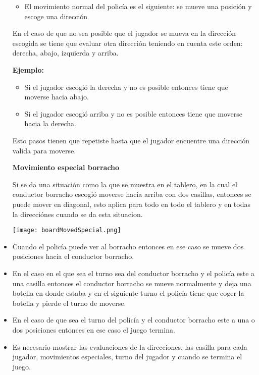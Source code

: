 \documentclass[10pt,a4paper]{article}
\begin{document}
\begin{itemize}
\begin{itemize}
		\item El movimiento normal del policía es el siguiente: se mueve una posición y escoge una dirección
	\end{itemize}
	En el caso de que no sea posible que el jugador se mueva en la dirección escogida se tiene que evaluar otra dirección teniendo en cuenta este orden: derecha, abajo, izquierda y arriba.
	\begin{flushleft}
		\textbf{Ejemplo:}
	\end{flushleft}
	\begin{itemize}
		\item Si el jugador escogió la derecha y no es posible entonces tiene que moverse hacia abajo.
		\item Si el jugador escogió arriba y no es posible entonces tiene que moverse hacia la derecha.
	\end{itemize}
	Esto pasos tienen que repetiste hasta que el jugador encuentre una dirección valida para moverse.
	\begin{flushleft}
		\textbf{Movimiento especial borracho}
	\end{flushleft}
	Si se da una situación como la que se muestra en el tablero, en la cual el conductor borracho escogió moverse hacia arriba con dos casillas, entonces se puede mover en diagonal, esto aplica para todo en todo el tablero y en todas la direcciónes cuando se da esta situacion.
	\begin{center}
		\texttt{[image: boardMovedSpecial.png]}
	\end{center}	
	\item Cuando el policía puede ver al borracho entonces en ese caso se mueve dos posiciones hacia el conductor borracho.
	\item En el caso en el que sea el turno sea del conductor borracho y el policía este a una casilla entonces el conductor borracho se mueve normalmente y deja una botella en donde estaba y  en el siguiente turno el policía tiene que coger la botella y pierde el turno de moverse.
	\item En el caso de que sea el turno del policía y el conductor borracho este a una o dos posiciones entonces en ese caso el juego termina.
	\item Es necesario mostrar las evaluaciones de la direcciones, las casilla para cada jugador, movimientos especiales, turno del jugador y cuando se termina el juego.
	
\end{itemize}
\end{document}
